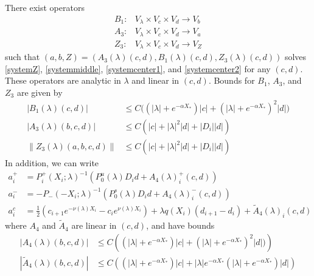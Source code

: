 \documentclass[thesis.tex]{subfiles}
\begin{document}
\begin{lemma}\label{Zinv2}
There exist operators
\begin{align*}
B_1: &V_\lambda \times V_c \times V_d \rightarrow V_b \\
A_3: &V_\lambda \times V_c \times V_d \rightarrow V_a \\
Z_3: &V_\lambda \times V_c \times V_d \rightarrow V_Z
\end{align*}
such that $( a, b, Z ) = ( A_3(\lambda)(c, d), B_1(\lambda)(c, d), Z_3(\lambda)(c, d) )$ solves \eqref{systemZ}, \eqref{systemmiddle}, \eqref{systemcenter1}, and \eqref{systemcenter2} for any $(c, d)$. These operators are analytic in $\lambda$ and linear in $(c, d)$. Bounds for $B_1$, $A_3$, and $Z_3$ are given by
\begin{align}
|B_1(\lambda)(c, d)| &\leq C\Big( (|\lambda| + e^{-\alpha X_*})|c| + (|\lambda| + e^{-\alpha X_*})^2 |d| \Big) \label{B1bound} \\
|A_3(\lambda)(b, c, d)| &\leq C \left( |c| + |\lambda|^2 |d| + |D_i||d| \right) \label{A3bound} \\
\| Z_3(\lambda)(a,b,c,d) \| &\leq C\left(|c| + |\lambda|^2|d| + |D_i||d| \right) \label{Z3bound}
\end{align} 
In addition, we can write
\begin{align*}
a_i^+ &= P_i^+(X_i; \lambda)^{-1} \left( P_0^u(\lambda) D_i d + A_4(\lambda)_i^+(c, d) \right) \\
a_i^- &= -P_-(-X_i; \lambda)^{-1} \left( P_0^s(\lambda) D_i d + A_4(\lambda)_i^-(c, d) \right) \\
a_i^c &= \frac{1}{2}\left( c_{i+1} e^{-\nu(\lambda)X_i} - c_i e^{\nu(\lambda)X_i} \right) + \lambda q(X_i)(d_{i+1} - d_i ) + \tilde{A}_4(\lambda)_i(c, d) 
\end{align*}
where $A_4$ and $\tilde{A}_4$ are linear in $(c, d)$, and have bounds
\begin{align}
|A_4(\lambda)(b, c, d)|
&\leq C \left( (|\lambda| + e^{-\alpha X_*})|c| + (|\lambda| + e^{-\alpha X_*})^2 |d| ) \right)  \label{A4bound} \\
|\tilde{A}_4(\lambda)(b, c, d)| &\leq C \left( (|\lambda| + e^{-\alpha X_*})|c| +  |\lambda| e^{-\alpha X_*} (|\lambda| + e^{-\alpha X_*}) |d| \right) \label{tildeA4bound}
\end{align}


\end{lemma}
\end{document}
